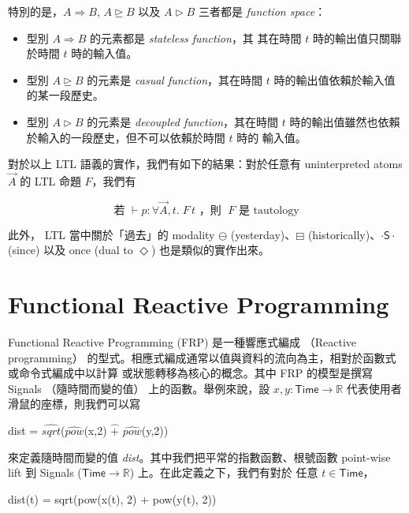 \documentclass{article}
\newcommand{\Time}{\mathsf{Time}}
\newcommand{\R}{\mathbb{R}}
\begin{document}
  特別的是，$A\Rightarrow B$, $A\unrhd B$ 以及 $A\rhd B$ 三者都是
  \emph{function space}：

  \begin{itemize}
    \item 型別 $A\Rightarrow B$ 的元素都是 \emph{stateless function}，其
    其在時間 $t$ 時的輸出值只關聯於時間 $t$ 時的輸入值。

    \item 型別 $A\unrhd B$ 的元素是 \emph{casual function}，其在時間 $t$
    時的輸出值依賴於輸入值的某一段歷史。

    \item 型別 $A\rhd B$ 的元素是 \emph{decoupled function}，其在時間 $t$
    時的輸出值雖然也依賴於輸入的一段歷史，但不可以依賴於時間 $t$ 時的
    輸入值。
  \end{itemize}

  對於以上 LTL 語義的實作，我們有如下的結果：對於任意有 uninterpreted atoms
  $\overrightarrow{A}$ 的 LTL 命題 $F$，我們有

  \[ \text{若 } \vdash p:\forall{\overrightarrow{A}},t.\; F\,t \text{ ，則 } \;F \text{ 是 tautology}\]

  此外， LTL 當中關於「過去」的 modality $\ominus$ (yesterday)、$\boxminus$
  (historically)、$\cdot\mathsf{S}\cdot$ (since) 以及 once (dual to $\Diamond$)
  也是類似的實作出來。

\section{Functional Reactive Programming}
  Functional Reactive Programming (FRP) 是一種響應式編成
  （Reactive programming）
  的型式。相應式編成通常以值與資料的流向為主，相對於函數式或命令式編成中以計算
  或狀態轉移為核心的概念。其中 FRP 的模型是撰寫 Signals （隨時間而變的值）
  上的函數。舉例來說，設 $x,y:\Time\to\R$ 代表使用者滑鼠的座標，則我們可以寫

  \begin{code}
  dist = $\widehat{\mathit{sqrt}}$($\widehat{\mathit{pow}}$(x,2) $\widehat{+}$ $\widehat{\mathit{pow}}$(y,2))
  \end{code}

  來定義隨時間而變的值 \textit{dist}。其中我們把平常的指數函數、根號函數
  point-wise lift 到 Signals ($\Time\to\R$) 上。在此定義之下，我們有對於
  任意 $t\in\Time$，

  \begin{code}
  dist(t) = sqrt(pow(x(t), 2) + pow(y(t), 2))
  \end{code}
\end{document}
